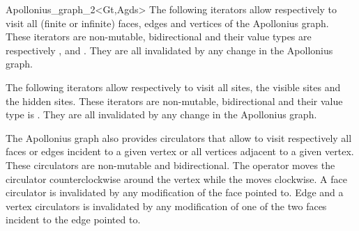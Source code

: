 \begin{ccRefClass}{Apollonius_graph_2<Gt,Agds>}
The following iterators allow respectively to visit all
(finite or infinite) faces, edges and vertices
of the Apollonius graph. These iterators are non-mutable, bidirectional
and their value types are respectively
,  and . 
They are all invalidated by any change in the Apollonius graph.


\ccGlue
{}

\ccGlue
{}

\ccGlue
{}




The following iterators allow respectively to visit 
all sites, the visible sites and the hidden sites.
These iterators are non-mutable, bidirectional and their value type
is . They are all invalidated by any change in the
Apollonius graph.


\ccGlue
{}

\ccGlue
{}

\ccGlue
{}


\ccThreeToTwo




The Apollonius graph also provides circulators that allow to visit 
respectively all faces or edges incident to a given vertex
or all vertices adjacent to a given vertex.
These circulators are non-mutable and bidirectional.
 The operator  moves the circulator
counterclockwise around the vertex while
the  moves clockwise.
A face circulator is invalidated by any modification of the face pointed to.
Edge and a vertex circulators is invalidated by any modification
of one of the two faces incident to the edge pointed to.


\end{ccRefClass}
